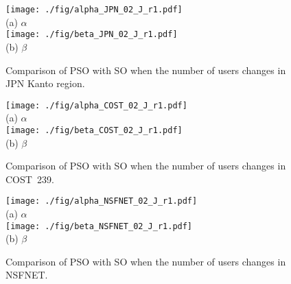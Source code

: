 \documentclass[10pt, letterpaper]{IEEEtran}
\begin{document}
\begin{CJK}{UTF8}{ipxm}
\begin{figure}[tb]
  \begin{center}
      \texttt{[image: ./fig/alpha\_JPN\_02\_J\_r1.pdf]} \\
      (a) $\alpha$ \\
      \texttt{[image: ./fig/beta\_JPN\_02\_J\_r1.pdf]} \\
      (b) $\beta$
  \end{center}
  \caption{Comparison of PSO with SO when the number of users changes in JPN Kanto region.}
  \label{fig:alpha_beta_JPN}
\end{figure}

\begin{figure}[tb]
  \begin{center}
      \texttt{[image: ./fig/alpha\_COST\_02\_J\_r1.pdf]} \\
      (a) $\alpha$ \\
      \texttt{[image: ./fig/beta\_COST\_02\_J\_r1.pdf]} \\
      (b) $\beta$
  \end{center}
  \caption{Comparison of PSO with SO when the number of users changes in COST~239.}
  \label{fig:alpha_beta_COST}
\end{figure}

\begin{figure}[tb]
  \begin{center}
      \texttt{[image: ./fig/alpha\_NSFNET\_02\_J\_r1.pdf]} \\
      (a) $\alpha$ \\
      \texttt{[image: ./fig/beta\_NSFNET\_02\_J\_r1.pdf]} \\
      (b) $\beta$
  \end{center}
  \caption{Comparison of PSO with SO when the number of users changes in NSFNET.}
  \label{fig:alpha_beta_NSFNET}
\end{figure}


\end{CJK}
\end{document}
